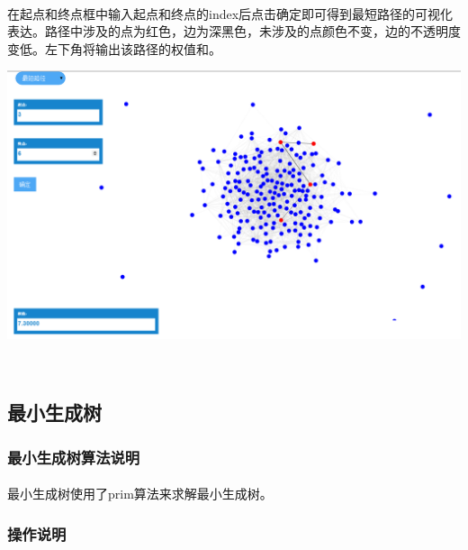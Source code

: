 \documentclass{article}
\begin{document}
\begin{CJK}{UTF8}{gkai}
			\paragraph{}
			在起点和终点框中输入起点和终点的index后点击确定即可得到最短路径的可视化表达。路径中涉及的点为红色，边为深黑色，未涉及的点颜色不变，边的不透明度变低。左下角将输出该路径的权值和。
		\\[\intextsep] 
		\begin{minipage}{\textwidth} 
		    \centering 
		    \includegraphics[width=0.9\linewidth]{path.PNG}
		\end{minipage} 
		\\[\intextsep] 

	\subsection{最小生成树}
		\subsubsection{最小生成树算法说明} %
			\paragraph{}
			最小生成树使用了prim算法来求解最小生成树。
		\subsubsection{操作说明}

\end{CJK}
\end{document}
